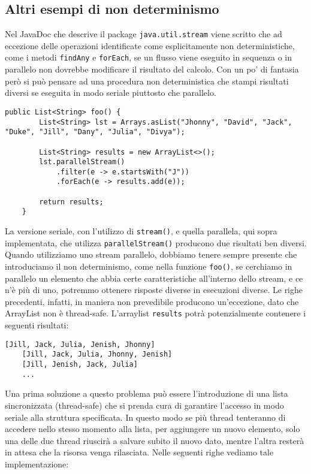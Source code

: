 						
		\subsection{Altri esempi di non determinismo}
		\label{esempi-non-det}
			Nel JavaDoc che descrive il package \lstinline|java.util.stream| viene scritto che ad eccezione delle operazioni identificate come esplicitamente non deterministiche, come i metodi \lstinline|findAny| e \lstinline|forEach|, se un flusso viene eseguito in sequenza o in parallelo non dovrebbe modificare il risultato del calcolo. Con un po' di fantasia però si può pensare ad una procedura non deterministica che stampi risultati diversi se eseguita in modo seriale piuttosto che parallelo.
			\begin{lstlisting}[breaklines=true]
	public List<String> foo() {
		List<String> lst = Arrays.asList("Jhonny", "David", "Jack", "Duke", "Jill", "Dany", "Julia", "Divya");
	
		List<String> results = new ArrayList<>();
		lst.parallelStream()
			.filter(e -> e.startsWith("J"))
			.forEach(e -> results.add(e));
			
		return results;
	}
			\end{lstlisting}
			La versione seriale, con l'utilizzo di \lstinline|stream()|, e quella parallela, qui sopra implementata, che utilizza \lstinline|parallelStream()| producono due risultati ben diversi. Quando utilizziamo uno stream parallelo, dobbiamo tenere sempre presente che introduciamo il non determinismo, come nella funzione \lstinline|foo()|, se cerchiamo in parallelo un elemento che abbia certe caratteristiche all'interno dello stream, e ce n'è più di uno, potremmo ottenere risposte diverse in esecuzioni diverse. Le righe precedenti, infatti, in maniera non prevedibile producono un'eccezione, dato che ArrayList non è thread-safe. L'arraylist \lstinline|results| potrà potenzialmente contenere i seguenti risultati:
			\begin{lstlisting}[numbers=none,frame=none]
	[Jill, Jack, Julia, Jenish, Jhonny]
	[Jill, Jack, Julia, Jhonny, Jenish]
	[Jill, Jenish, Jack, Julia]
	...
			\end{lstlisting}
			Una prima soluzione a questo problema può essere l'introduzione di una lista sincronizzata (thread-safe) che si prenda cura di garantire l'accesso in modo seriale alla struttura specificata. In questo modo se più thread tenteranno di accedere nello stesso momento alla lista, per aggiungere un nuovo elemento, solo una delle due thread riuscirà a salvare subito il nuovo dato, mentre l'altra resterà in attesa che la risorsa venga rilasciata. Nelle seguenti righe vediamo tale implementazione:

